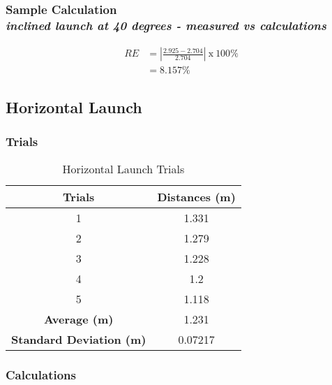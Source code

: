 \subsubsection{Sample Calculation \\ {\normalfont \small\textit{inclined launch at 40 degrees -  measured vs calculations}}}

\begin{align*}
	RE &= \left| {\frac{2.925-2.704}{2.704}} \right|\: \text{x}\: 100\% \\
			&= \boxed{8.157\%} 
\end{align*}

\subsection{Horizontal Launch}

\subsubsection{Trials}
\begin{table}[H]
\centering
\begin{tabular}{cc}
\textbf{Trials} & \textbf{Distances (m)} \\ \hline
1 & 1.331 \\
2 & 1.279 \\
3 & 1.228 \\
4 & 1.2 \\
5 & 1.118 \\ \hline
\textbf{Average (m)} & 1.231 \\
\textbf{Standard Deviation (m)} & 0.07217
\end{tabular}
\caption{Horizontal Launch Trials}
\label{tab:HLt}
\end{table}

\subsubsection{Calculations}

